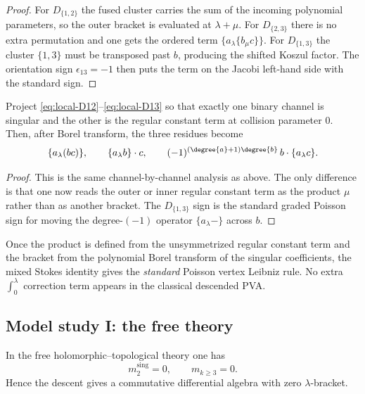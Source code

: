 \begin{proof}
For $D_{\{1,2\}}$ the fused cluster carries the sum of the incoming polynomial
parameters, so the outer bracket is evaluated at $\lambda+\mu$.
For $D_{\{2,3\}}$ there is no extra permutation and one gets the ordered term
$\{a_\lambda\{b_\mu c\}\}$.
For $D_{\{1,3\}}$ the cluster $\{1,3\}$ must be transposed past $b$, producing the
shifted Koszul factor. The orientation sign $\epsilon_{13}=-1$ then puts the term on
the Jacobi left-hand side with the standard sign.
\end{proof}

\begin{proposition}
\label{prop:mixed-projection}
Project \eqref{eq:local-D12}--\eqref{eq:local-D13} so that exactly one binary channel is
singular and the other is the regular constant term at collision parameter $0$. Then,
after Borel transform, the three residues become
\[
\{a_\lambda(bc)\},
\qquad
\{a_\lambda b\}\cdot c,
\qquad
(-1)^{(\degree{a}+1)\degree{b}}\,b\cdot\{a_\lambda c\}.
\]
\end{proposition}

\begin{proof}
This is the same channel-by-channel analysis as above. The only difference is that
one now reads the outer or inner regular constant term as the product $\mu$ rather than
as another bracket. The $D_{\{1,3\}}$ sign is the standard graded Poisson sign for
moving the degree-$(-1)$ operator $\{a_\lambda-\}$ across $b$.
\end{proof}

\begin{remark}
Once the product is defined from the unsymmetrized regular constant term and the bracket
from the polynomial Borel transform of the singular coefficients, the mixed Stokes
identity gives the \emph{standard} Poisson vertex Leibniz rule. No extra
$\int_0^\lambda$ correction term appears in the classical descended PVA.
\end{remark}

\subsection{Model study I: the free theory}

\begin{proposition}
\label{prop:free-study}
In the free holomorphic--topological theory one has
\[
m_2^{\mathrm{sing}}=0,\qquad m_{k\ge3}=0.
\]
Hence the descent gives a commutative differential algebra with zero
$\lambda$-bracket.
\end{proposition}

